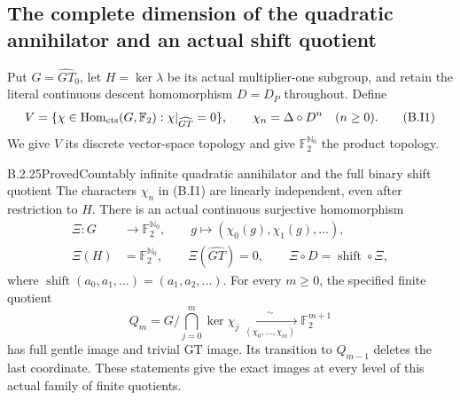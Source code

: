 \subsection{The complete dimension of the quadratic annihilator and an actual shift quotient}

Put $G=\widehat{GT}_0$, let $H=\ker\lambda$ be its actual
multiplier-one subgroup, and retain the literal continuous descent
homomorphism $D=D_P$ throughout.  Define
\[
 V=\{\chi\in\operatorname{Hom}_{\rm cts}(G,\mathbb F_2):
                              \chi|_{\widehat{GT}}=0\},
 \qquad \chi_n=\Delta\circ D^n\quad(n\ge0).
                                                        \tag{B.I1}
\]
We give $V$ its discrete vector-space topology and give
$\mathbb F_2^{\mathbb N_0}$ the product topology.

\begin{result}{B.2.25}{Proved}{Countably infinite quadratic annihilator and the full binary shift quotient}
The characters $\chi_n$ in (B.I1) are linearly independent,
even after restriction to $H$.  There is an actual continuous
surjective homomorphism
\[
 \begin{aligned}
 \Xi:G&\longrightarrow\mathbb F_2^{\mathbb N_0},\qquad
               g\longmapsto(\chi_0(g),\chi_1(g),\ldots),\\
 \Xi(H)&=\mathbb F_2^{\mathbb N_0},\qquad
 \Xi(\widehat{GT})=0,\qquad
 \Xi\circ D=\operatorname{shift}\circ\Xi,
 \end{aligned}                                           \tag{B.I2}
\]
where $\operatorname{shift}(a_0,a_1,\ldots)=(a_1,a_2,\ldots)$.
For every $m\ge0$, the specified finite quotient
\[
 Q_m=G\Big/\bigcap_{j=0}^{m}\ker\chi_j
       \xrightarrow[\ (\chi_0,\ldots,\chi_m)\ ]{\ \sim\ }
                                      \mathbb F_2^{m+1}       \tag{B.I3}
\]
has full gentle image and trivial GT image.  Its transition to
$Q_{m-1}$ deletes the last coordinate.  These statements give
the exact images at every level of this actual family of finite
quotients.


\end{result}
